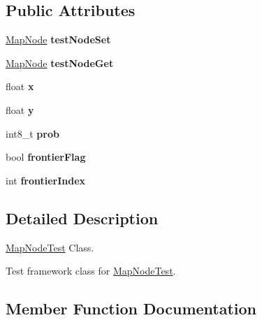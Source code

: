 \subsection*{Public Attributes}
\begin{DoxyCompactItemize}
\item 
\hyperlink{classMapNode}{Map\+Node} {\bfseries test\+Node\+Set}\hypertarget{classMapNodeTest_a2f493683755b45e53f25a97e628ebb03}{}\label{classMapNodeTest_a2f493683755b45e53f25a97e628ebb03}

\item 
\hyperlink{classMapNode}{Map\+Node} {\bfseries test\+Node\+Get}\hypertarget{classMapNodeTest_a5a9e610742272157ad94a7a439dc079d}{}\label{classMapNodeTest_a5a9e610742272157ad94a7a439dc079d}

\item 
float {\bfseries x}\hypertarget{classMapNodeTest_ade7b439cf615d750e8f4ad5a977e2938}{}\label{classMapNodeTest_ade7b439cf615d750e8f4ad5a977e2938}

\item 
float {\bfseries y}\hypertarget{classMapNodeTest_ad6ae973ba822364cc90756f73015ba4a}{}\label{classMapNodeTest_ad6ae973ba822364cc90756f73015ba4a}

\item 
int8\+\_\+t {\bfseries prob}\hypertarget{classMapNodeTest_a6f4c4344863c169a9b733eb357c8ec2a}{}\label{classMapNodeTest_a6f4c4344863c169a9b733eb357c8ec2a}

\item 
bool {\bfseries frontier\+Flag}\hypertarget{classMapNodeTest_afd3c21a4c35476863aa06c477a86bcb3}{}\label{classMapNodeTest_afd3c21a4c35476863aa06c477a86bcb3}

\item 
int {\bfseries frontier\+Index}\hypertarget{classMapNodeTest_aa57879f8f1138116b711426f86709469}{}\label{classMapNodeTest_aa57879f8f1138116b711426f86709469}

\end{DoxyCompactItemize}


\subsection{Detailed Description}
\hyperlink{classMapNodeTest}{Map\+Node\+Test} Class. 

Test framework class for \hyperlink{classMapNodeTest}{Map\+Node\+Test}. 

\subsection{Member Function Documentation}
